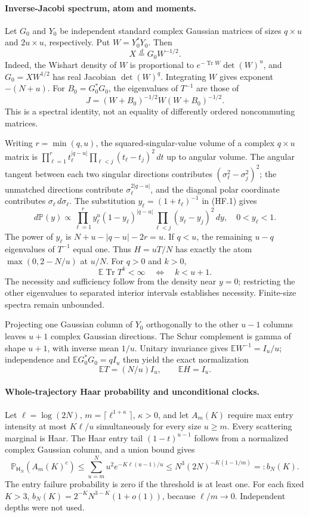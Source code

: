 \paragraph{Inverse-Jacobi spectrum, atom and moments.}
Let $G_0$ and $Y_0$ be independent standard complex Gaussian matrices
of sizes $q\times u$ and $2u\times u$, respectively. Put $W=Y_0^*Y_0$.
Then
\[
 X\stackrel{d}{=}G_0W^{-1/2}.
\]
Indeed, the Wishart density of $W$ is proportional to
$e^{-\operatorname{Tr}W}\det(W)^u$, and $G_0=XW^{1/2}$ has real
Jacobian $\det(W)^q$. Integrating $W$ gives exponent $-(N+u)$.
For $B_0=G_0^*G_0$, the eigenvalues of $T^{-1}$ are those of
\[
 J=(W+B_0)^{-1/2}W(W+B_0)^{-1/2}.                    \tag{HF.3}
\]
This is a spectral identity, not an equality of differently ordered
noncommuting matrices.

Writing $r=\min(q,u)$, the squared-singular-value volume of a complex
$q\times u$ matrix is
$\prod_{\ell=1}^r t_\ell^{|q-u|}
 \prod_{\ell<j}(t_\ell-t_j)^2\,dt$ up to angular volume.
The angular tangent between each two singular directions contributes
$(\sigma_\ell^2-\sigma_j^2)^2$; the unmatched directions contribute
$\sigma_\ell^{2|q-u|}$, and the diagonal polar coordinate contributes
$\sigma_\ell\,d\sigma_\ell$.
The substitution $y_\ell=(1+t_\ell)^{-1}$ in (HF.1) gives
\[
 d\mathbb P(y)\propto
 \prod_{\ell=1}^r y_\ell^u(1-y_\ell)^{|q-u|}
 \prod_{\ell<j}(y_\ell-y_j)^2\,dy,\quad 0<y_\ell<1.    \tag{HF.4}
\]
The power of $y_\ell$ is $N+u-|q-u|-2r=u$.
If $q<u$, the remaining $u-q$ eigenvalues of $T^{-1}$ equal one.
Thus $H=uT/N$ has exactly the atom $\max(0,2-N/u)$ at $u/N$.
For $q>0$ and $k>0$,
\[
 \mathbb E\operatorname{Tr}T^k<\infty
       \quad\Longleftrightarrow\quad k<u+1 .
\]
The necessity and sufficiency follow from the density near $y=0$;
restricting the other eigenvalues to separated interior intervals
establishes necessity. Finite-size spectra remain unbounded.

Projecting one Gaussian column of $Y_0$ orthogonally to the other
$u-1$ columns leaves $u+1$ complex Gaussian directions. The Schur
complement is gamma of shape $u+1$, with inverse mean $1/u$.
Unitary invariance gives $\mathbb EW^{-1}=I_u/u$; independence and
$\mathbb EG_0^*G_0=qI_u$ then yield the exact normalization
\[
 \mathbb ET=(N/u)I_u,\qquad \mathbb EH=I_u.            \tag{HF.5}
\]

\paragraph{Whole-trajectory Haar probability and unconditional clocks.}
Let $\ell=\log(2N)$, $m=\lceil\ell^{1+\kappa}\rceil$, $\kappa>0$,
and let $A_m(K)$ require max entry intensity at most $K\ell/u$
simultaneously for every size $u\ge m$.
Every scattering marginal is Haar. The Haar entry tail
$(1-t)^{u-1}$ follows from a normalized complex Gaussian column,
and a union bound gives
\[
 \mathbb P_{\mathsf H_N}(A_m(K)^c)
 \le\sum_{u=m}^N u^2e^{-K\ell(u-1)/u}
 \le N^3(2N)^{-K(1-1/m)}=:b_N(K).                    \tag{HF.6}
\]
The entry failure probability is zero if the threshold is at least one.
For each fixed $K>3$,
$b_N(K)=2^{-K}N^{3-K}(1+o(1))$, because $\ell/m\to0$.
Independent depths were not used.

